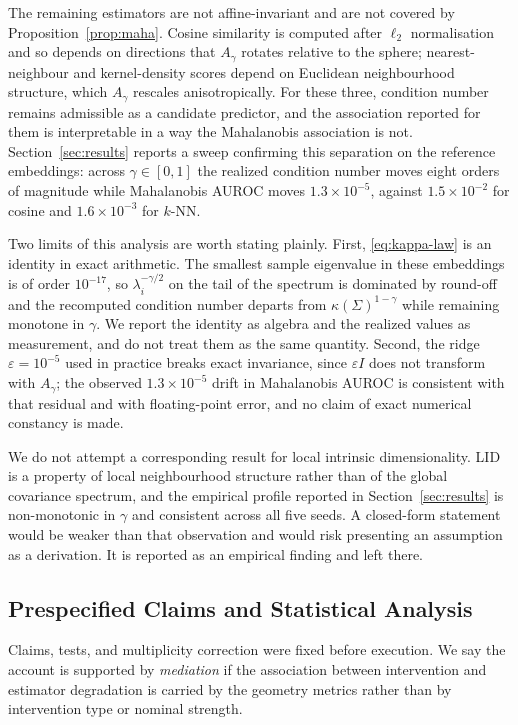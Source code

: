The remaining estimators are not affine-invariant and are not covered by
Proposition~\ref{prop:maha}. Cosine similarity is computed after
$\ell_2$ normalisation and so depends on directions that $A_{\gamma}$ rotates
relative to the sphere; nearest-neighbour and kernel-density scores depend on
Euclidean neighbourhood structure, which $A_{\gamma}$ rescales anisotropically.
For these three, condition number remains admissible as a candidate predictor,
and the association reported for them is interpretable in a way the Mahalanobis
association is not. Section~\ref{sec:results} reports a sweep confirming this
separation on the reference embeddings: across $\gamma \in [0, 1]$ the realized
condition number moves eight orders of magnitude while Mahalanobis AUROC moves
$1.3 \times 10^{-5}$, against $1.5 \times 10^{-2}$ for cosine and
$1.6 \times 10^{-3}$ for $k$-NN.

Two limits of this analysis are worth stating plainly. First,
\eqref{eq:kappa-law} is an identity in exact arithmetic. The smallest sample
eigenvalue in these embeddings is of order $10^{-17}$, so $\lambda_i^{-\gamma/2}$
on the tail of the spectrum is dominated by round-off and the recomputed
condition number departs from $\kappa(\Sigma)^{1-\gamma}$ while remaining
monotone in $\gamma$. We report the identity as algebra and the realized values
as measurement, and do not treat them as the same quantity. Second, the ridge
$\varepsilon = 10^{-5}$ used in practice breaks exact invariance, since
$\varepsilon I$ does not transform with $A_{\gamma}$; the observed
$1.3 \times 10^{-5}$ drift in Mahalanobis AUROC is consistent with that residual
and with floating-point error, and no claim of exact numerical constancy is
made.

We do not attempt a corresponding result for local intrinsic dimensionality.
LID is a property of local neighbourhood structure rather than of the global
covariance spectrum, and the empirical profile reported in
Section~\ref{sec:results} is non-monotonic in $\gamma$ and consistent across all
five seeds. A closed-form statement would be weaker than that observation and
would risk presenting an assumption as a derivation. It is reported as an
empirical finding and left there.

\subsection{Prespecified Claims and Statistical Analysis}

Claims, tests, and multiplicity correction were fixed before execution. We
say the account is supported by \emph{mediation} if the association between
intervention and estimator degradation is carried by the geometry metrics
rather than by intervention type or nominal strength.

